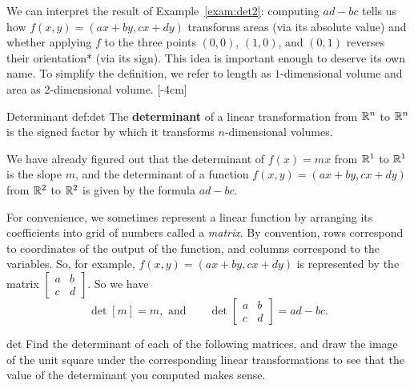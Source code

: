 \documentclass{watsonbook}
\begin{document}
We can interpret the result of Example~\ref{exam:det2}: computing
$ad - bc$ tells us how $f(x,y) = (ax + by, cx + dy)$ transforms areas
(via its absolute value) and whether applying $f$ to the three points
$(0,0)$, $(1,0)$, and $(0,1)$ reverses their orientation* (via its
sign). This idea is important enough to deserve its own name. To
simplify the definition, we refer to length as $1$-dimensional volume
and area as 2-dimensional volume. [-4cm]

\begin{defn}{Determinant }{def:det} \bang{-5mm}
  The \textbf{determinant} of a linear transformation from $\mathbb{R}^n$ to
  $\mathbb{R}^n$ is the signed factor by which it transforms $n$-dimensional
  volumes. 
\end{defn}

We have already figured out that the determinant of $f(x) = mx$ from
$\mathbb{R}^1$ to $\mathbb{R}^1$ is the slope $m$, and the determinant of a function
$f(x,y) = (ax + by, cx + dy)$ from $\mathbb{R}^2$ to $\mathbb{R}^2$ is given by the
formula $ad - bc$.

For convenience, we sometimes represent a linear function by arranging
its coefficients into grid of numbers called a \textit{matrix}. By
convention, rows correspond to coordinates of the output of the
function, and columns correspond to the variables. So, for example,
$f(x,y) = (ax + by, cx + dy)$ is represented by the matrix
$\left[\begin{array}{cc} a & b \\ c & d \end{array}\right]$. So we
have
\[
\det [m] = m, \text{ and} \qquad \det \left[\begin{array}{cc} a & b \\ c & d \end{array}\right] = ad - bc. 
\]

\begin{exercise}{}{det}
  Find the determinant of each of the following matrices, and draw the
  image of the unit square under the corresponding linear
  transformations to see that the value of the determinant you
  computed makes sense.

\pairofprobs{$\left[\begin{array}{cc} 1 & 0 \\ 0 & -1 \end{array}\right]$}{
$\left[\begin{array}{cc} 2 & 1 \\ 0 & 2 \end{array}\right]$}

\pairofprobs{$\left[\begin{array}{cc} 0 & 1 \\ -1 & 0 \end{array}\right]$}{
$\left[\begin{array}{cc} 2 & 1  \\ 4 & 2 \end{array}\right]$}
\end{exercise}
\end{document}
